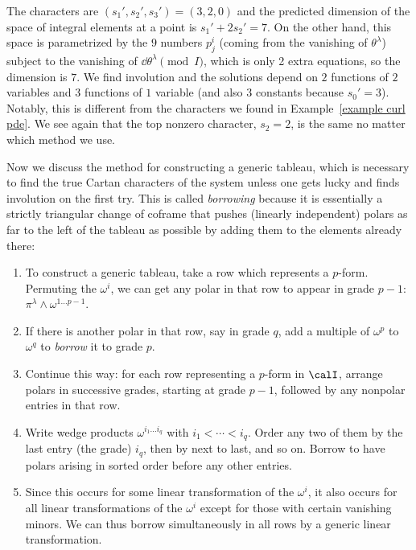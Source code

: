 \begin{example}
\[    \]
    The characters are $(s_1',s_2',s_3')=(3,2,0)$ and the predicted dimension of the space of integral elements at a point is $s_1'+2s_2'=7$. On the other hand, this space is parametrized by the $9$ numbers $p^i_j$ (coming from the vanishing of $\theta^\lambda$) subject to the vanishing of $\dd\theta^\lambda \pmod{I}$, which is only 2 extra equations, so the dimension is $7$. We find involution and the solutions depend on $2$ functions of $2$ variables and $3$ functions of $1$ variable (and also $3$ constants because $s_0'=3$). Notably, this is different from the characters we found in Example~\ref{example curl pde}. We see again that the top nonzero character, $s_2=2$, is the same no matter which method we use.
\end{example}

Now we discuss the method for constructing a generic tableau, which is necessary to find the true Cartan characters of the system unless one gets lucky and finds involution on the first try. This is called \emph{borrowing} because it is essentially a strictly triangular change of coframe that pushes (linearly independent) polars as far to the left of the tableau as possible by adding them to the elements already there:
\begin{enumerate}
    \item To construct a generic tableau, take a row which represents a $p$-form. Permuting the $\omega^i$, we can get any polar in that row to appear in grade $p-1$: $\pi^\lambda\wedge \omega^{1\ldots p-1}$. 
    \item If there is another polar in that row, say in grade $q$, add a multiple of $\omega^p$ to $\omega^q$ to \emph{borrow} it to grade $p$. 
    \item Continue this way: for each row representing a $p$-form in $\calI$, arrange polars in successive grades, starting at grade $p-1$, followed by any nonpolar entries in that row.
    \item Write wedge products $\omega^{i_1\ldots i_q}$ with $i_1<\cdots <i_q$. Order any two of them by the last entry (the grade) $i_q$, then by next to last, and so on. Borrow to have polars arising in sorted order before any other entries.
    \item Since this occurs for some linear transformation of the $\omega^i$, it also occurs for all linear transformations of the $\omega^i$ except for those with certain vanishing minors. We can thus borrow simultaneously in all rows by a generic linear transformation.
\end{enumerate}

